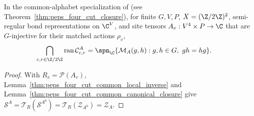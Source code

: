\begin{lemma}%
    \label{thm:peps_four_cut_common_closure}
    \leanok
    In the common-alphabet specialization of \cite[Theorem~5.5]{Schuch2010PEPS} (see Theorem~\ref{thm:peps_four_cut_closure}), for finite $G,V,P$, $X=(\Z/2\Z)^2$, semi-regular bond representations on $\C^V$, and site tensors $A_v:V^4\times P\to\C$ that are $G$-injective for their matched actions $\rho_v$,
    \begin{align}
        \bigcap_{c,r\in\Z/2\Z}\operatorname{ran}\mathcal C^A_{c,r}
         & =\spn_{\C}\{\mathcal M_A(g,h):g,h\in G,\ gh=hg\}.
        \label{eq:peps_common_four_cut_closure}
    \end{align}
\end{lemma}
\begin{proof}\leanok
    With $R_v=\mathcal P(A_v)$, Lemma~\ref{thm:peps_four_cut_common_local_inverse} and Lemma~\ref{thm:peps_four_cut_common_canonical_closure} give $\mathcal S^A=\mathcal T_R(\mathcal S^{A^0})=\mathcal T_R(\mathcal Z_{A^0})=\mathcal Z_A$.
\end{proof}
